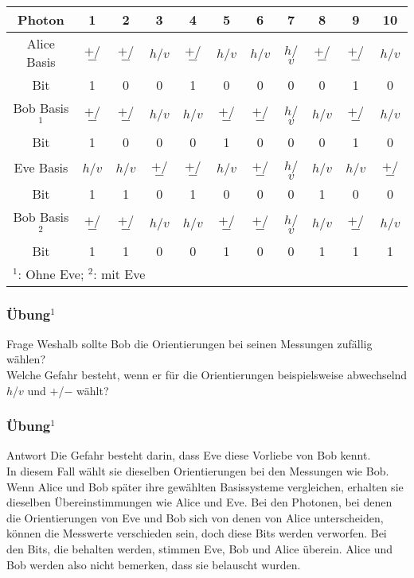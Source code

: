 \begin{frame}
	\small
	\begin{tabular}{c|c|c|c|c|c|c|c|c|c|c}
		Photon & 1 & 2 & 3 & 4 & 5 & 6 & 7 & 8 & 9 & 10  \\
		\hline
		Alice Basis & \tiny $+$/$-$ & \tiny $+$/$-$ & \tiny $h$/$v$ & \tiny $+$/$-$ & \tiny $h$/$v$ & \tiny $h$/$v$ & \tiny $h$/$v$ & \tiny $+$/$-$ & \tiny $+$/$-$ & \tiny $h$/$v$ \\
		Bit & 1 & 0 & 0 & 1 & 0 & 0 & 0 & 0 & 1 & 0 \\
		\hline
		Bob Basis${^1}$ & \tiny $+$/$-$ & \tiny $+$/$-$ & \tiny $h$/$v$ & \tiny $h$/$v$ & \tiny $+$/$-$ & \tiny $+$/$-$ & \tiny $h$/$v$ & \tiny $h$/$v$ & \tiny $+$/$-$ & \tiny $h$/$v$ \\
		Bit & 1 & 0 & 0 & 0 & 1 & 0 & 0 & 0 & 1 & 0 \\
		\hline
		Eve Basis & \tiny $h$/$v$ & \tiny $h$/$v$ & \tiny $+$/$-$ & \tiny $+$/$-$ & \tiny $h$/$v$ & \tiny $+$/$-$ & \tiny $h$/$v$ & \tiny $h$/$v$ & \tiny $h$/$v$ & \tiny $+$/$-$ \\
		Bit & 1 & 1 & 0 & 1 & 0 & 0 & 0 & 1 & 0 & 0 \\
		\hline
		Bob Basis${^2}$ & \tiny $+$/$-$ & \tiny $+$/$-$ & \tiny $h$/$v$ & \tiny $h$/$v$ & \tiny $+$/$-$ & \tiny $+$/$-$ & \tiny $h$/$v$ & \tiny $h$/$v$ & \tiny $+$/$-$ & \tiny $h$/$v$ \\
		Bit & 1 & 1 & 0 & 0 & 1 & 0 & 0 & 1 & 1 & 1 \\
		\midrule
		\multicolumn{11}{l}{${^1}$: Ohne Eve; ${^2}$: mit Eve}
	\end{tabular}
\end{frame}

\begin{frame}
	\frametitle{{\"U}bung${^1}$}
	\begin{block}{Frage}
		Weshalb sollte Bob die Orientierungen bei seinen Messungen zuf{\"a}llig w{\"a}hlen?\\
		Welche Gefahr besteht, wenn er f{\"u}r die Orientierungen beispielsweise abwechselnd $h$/$v$ und $+$/$-$ w{\"a}hlt?
	\end{block}
\end{frame}

\begin{frame}
	\frametitle{{\"U}bung${^1}$}
	\begin{block}{Antwort}
	Die Gefahr besteht darin, dass Eve diese Vorliebe von Bob kennt. 
	\\
	\justifying
	In diesem Fall wählt sie dieselben Orientierungen bei den Messungen wie Bob. Wenn Alice und Bob später ihre gewählten Basissysteme vergleichen, erhalten sie dieselben Übereinstimmungen wie Alice und Eve. Bei den Photonen, bei denen die Orientierungen von Eve und Bob sich von denen von Alice unterscheiden, können die Messwerte verschieden sein, doch diese Bits werden verworfen. Bei den Bits, die behalten werden, stimmen Eve, Bob und Alice überein. Alice und Bob werden also nicht bemerken, dass sie belauscht wurden.
	\end{block}
\end{frame}
